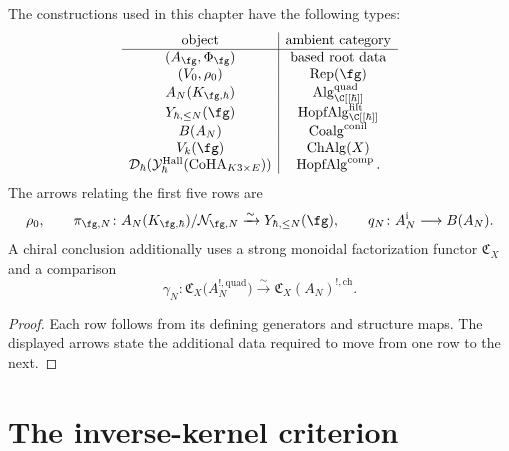 \begin{proposition}
\label{prop:exceptional-yangian-type-separation}
The constructions used in this chapter have the following types:
\[
\begin{array}{c|c}
\text{object}&\text{ambient category}\\ \hline
(A_{\fg},\Phi_{\fg})&\text{based root data}\\
(V_0,\rho_0)&\operatorname{Rep}(\fg)\\
A_N(K_{\fg,\hbar})&\operatorname{Alg}^{\mathrm{quad}}_{\C[[\hbar]]}\\
Y_{\hbar,\leq N}(\fg)&\operatorname{HopfAlg}^{\mathrm{filt}}_{\C[[\hbar]]}\\
B(A_N)&\operatorname{Coalg}^{\mathrm{conil}}\\
V_k(\fg)&\operatorname{ChAlg}(X)\\
\mathcal D_\hbar(\mathcal Y^{\mathrm{Hall}}_\hbar(\mathrm{CoHA}_{K3\times E}))
&\operatorname{HopfAlg}^{\mathrm{comp}}.
\end{array}
\]
The arrows relating the first five rows are
\[
\rho_0,\qquad
\pi_{\fg,N}\colon A_N(K_{\fg,\hbar})/\mathcal N_{\fg,N}
\xrightarrow{\sim}Y_{\hbar,\leq N}(\fg),
\qquad
q_N\colon A_N^{\mathrm i}\longrightarrow B(A_N).
\]
A chiral conclusion additionally uses a strong monoidal
factorization functor $\mathfrak C_X$ and a comparison
\[
\gamma_N\colon
\mathfrak C_X\bigl(A_N^{!,\mathrm{quad}}\bigr)
\xrightarrow{\sim}
\mathfrak C_X(A_N)^{!,\mathrm{ch}}.
\]
\end{proposition}

\begin{proof}
Each row follows from its defining generators and structure maps.
The displayed arrows state the additional data required to move from
one row to the next.
\end{proof}

\section{The inverse-kernel criterion}
\label{sec:exceptional-yangian-template}

